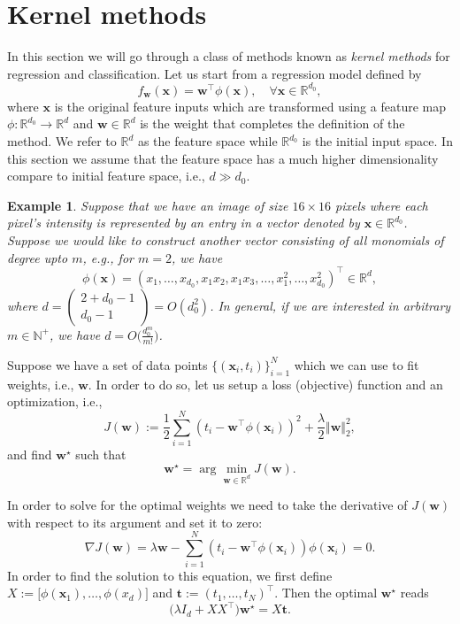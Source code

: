 \documentclass[11pt]{article}
\newcommand{\w}{\textbf{w}}
\newcommand{\x}{\textbf{x}}
\newcommand{\R}{\mathbb{R}}
\newcommand{\N}{\mathbb{N}}
\newcommand{\norm}[1]{\Vert #1 \Vert}
\newcommand{\bo}[1]{{\mathbf #1}}
\newcommand{\Arr}[2]{
	\left(
		\begin{array}{c}
		{#1} 
		\\
		{#2}
		\end{array}
	\right)
}
\newtheorem{example}{Example}[section]
\begin{document}
\section{Kernel methods}
In this section we will go through a class of methods known as {\it kernel
methods} for regression and classification. Let us start from a
regression model defined by
\begin{equation}
  f_\w(\x) = \w^\top \phi(\x), \quad \forall \x \in \R^{d_0},
\end{equation}
where $\x$ is the original feature inputs which are transformed using a
feature map $\phi: \R^{d_0} \rightarrow \R^{d}$ and $\w \in \R^{d}$ is
the weight that completes the definition of the method. We refer to
$\R^{d}$ as the feature space while $\R^{d_0}$ is the initial input
space. In this section we assume that the feature space has a much
higher dimensionality compare to initial feature space, i.e., $d \gg
d_0$.

\begin{example} \label{example:kernel}
  Suppose that we have an image of size $16 \times 16$ pixels where
  each pixel's intensity is represented by an entry in a vector
  denoted by $\x \in \R^{d_0}$. Suppose we would like to construct
  another vector consisting of all monomials of degree upto $m$, e.g.,
  for $m=2$, we have
  \begin{equation}
    \phi(\x) = (x_1, \dots, x_{d_0}, x_1 x_2, x_1 x_3, \dots,
    x_1^2, \dots, x_{d_0}^2)^\top \in \R^{d},
  \end{equation}
  where $d = \Arr{2+  d_0 - 1}{d_0 - 1} = O(d_0^2)$. In general, if we
  are interested in arbitrary $m \in \N^+$, we have
  $d = O\big( \frac{d_0^m}{m!} \big)$.
\end{example}

Suppose we have a set of data points $\{(\x_i, t_i)\}_{i=1}^{N}$ which
we can use to fit weights, i.e., $\w$. In order to do so, let us setup
a loss (objective) function and an optimization, i.e.,
\begin{equation}
  J(\w) := \frac12 \sum_{i=1}^{N} (t_i - \w^\top \phi(\x_i))^2 +
  \frac{\lambda}{2} \norm{\w}_2^2,
\end{equation}
and find $\w^\star$ such that
\begin{equation}
  \w^\star = \arg \min_{\w \in \R^{d}} J(\w).
\end{equation}

In order to solve for the optimal weights we need to take the
derivative of $J(\w)$ with respect to its argument and set it to
zero:
\begin{equation}
  \nabla J(\w) = \lambda \w - \sum_{i=1}^{N} (t_i - \w^\top \phi(\x_i)) \phi(\x_i)
  = 0.
\end{equation}
In order to find the solution to this equation, we first define
$X:=\big[\phi(\x_1), \dots, \phi(x_d) \big]$ and $\bo{t} := (t_1,
\dots, t_N)^\top$. Then the optimal
$\w^\star$ reads
\begin{equation}
  \big( \lambda I_d + X X^\top \big) \w^\star = X \bo{t}.
\end{equation}
\end{document}
